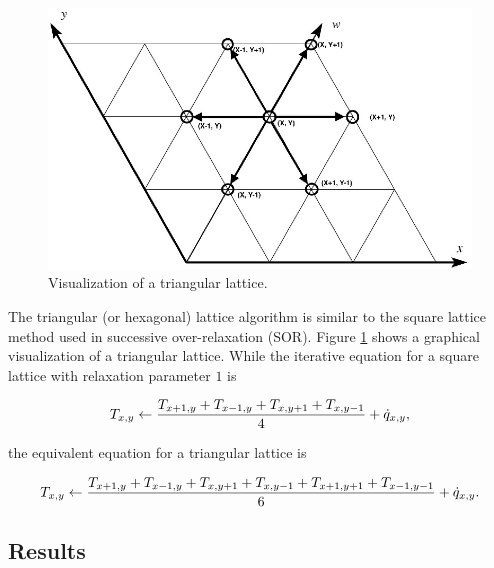 \documentclass[paper=a4, fontsize=11pt]{scrartcl} %
\numberwithin{equation}{section} %
\numberwithin{figure}{section} %
\numberwithin{table}{section} %
\begin{document}
\begin{figure}
\centering
\includegraphics[width=120mm]{tl.eps}
\caption{Visualization of a triangular lattice.}
\label{fig:tl}
\end{figure}

The triangular (or hexagonal) lattice algorithm is similar to the square lattice method used in successive over-relaxation (SOR). Figure \ref{fig:tl} shows a graphical visualization of a triangular lattice. While the iterative equation for a square lattice with relaxation parameter $1$ is

\begin{equation}
	T_{x,y} \gets {T_{x+1,y} + T_{x-1,y} + T_{x,y+1} + T_{x,y-1} \over 4} + \dot{q}_{x,y},
\end{equation}

the equivalent equation for a triangular lattice is

\begin{equation}
	T_{x,y} \gets {T_{x+1,y} + T_{x-1,y} + T_{x,y+1} + T_{x,y-1} + T_{x+1,y+1} + T_{x-1,y-1} \over 6} + \dot{q}_{x,y}.
\end{equation}

\subsection{Results}
\end{document}

